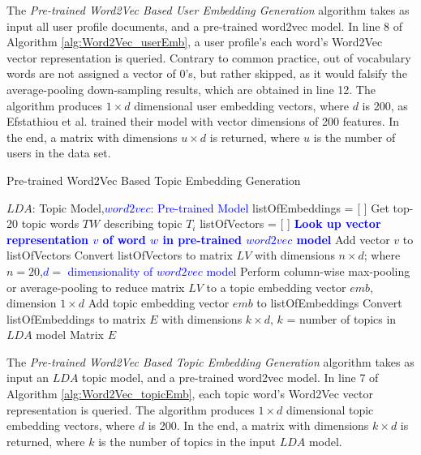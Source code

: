              The \emph{Pre-trained Word2Vec Based User Embedding Generation} algorithm takes as input all user profile documents, and a pre-trained word2vec model. In line 8 of Algorithm \ref{alg:Word2Vec_userEmb}, a user profile's each word's Word2Vec vector representation is queried. Contrary to common practice, out of vocabulary words are not assigned a vector of 0's, but rather skipped, as it would falsify the average-pooling down-sampling results, which are obtained in line 12. The algorithm produces $1 \times d$ dimensional user embedding vectors, where $d$ is 200, as Efstathiou et al. \cite{efstathiou2018word} trained their model with vector dimensions of 200 features. In the end, a matrix with dimensions $u \times d$ is returned, where $u$ is the number of users in the data set.
        
            \begin{algorithm}
            \caption{Pre-trained Word2Vec Based Topic Embedding Generation}
            \label{alg:Word2Vec_topicEmb}
            \begin{algorithmic}[1]
                \REQUIRE $LDA$: Topic Model,\textcolor{blue}{$word2vec$: Pre-trained Model}
                \STATE listOfEmbeddings = [ ]
                    \STATE Get top-20 topic words $TW$ describing topic $T_i$
                    \STATE listOfVectors = [ ]
                    \STATE
                        \STATE \textbf{\textcolor{blue}{Look up vector representation $v$ of word $w$ in pre-trained $word2vec$ model}}
                        \STATE Add vector $v$ to listOfVectors
                    \ENDFOR
                    \STATE Convert listOfVectors to matrix $LV$ with dimensions $n \times d$; where $n=20$,\textcolor{blue}{$d =$  dimensionality of $word2vec$ model}
                    \STATE Perform column-wise max-pooling or average-pooling to reduce matrix $LV$ to a topic embedding vector $emb$, dimension $1 \times d$
                    \STATE Add topic embedding vector $emb$ to listOfEmbeddings
                \ENDFOR
                \STATE Convert listOfEmbeddings to matrix $E$ with dimensions $k \times d$,  $k$ = number of topics in $LDA$ model
                \RETURN Matrix $E$
            \end{algorithmic}
            \end{algorithm}
            
            The \emph{Pre-trained Word2Vec Based Topic Embedding Generation} algorithm takes as input an $LDA$ topic model, and a pre-trained word2vec model. In line 7 of Algorithm \ref{alg:Word2Vec_topicEmb}, each topic word's Word2Vec vector representation is queried. The algorithm produces $1 \times d$ dimensional topic embedding vectors, where $d$ is 200. In the end, a matrix with dimensions $k \times d$ is returned, where $k$ is the number of topics in the input $LDA$ model.
            
